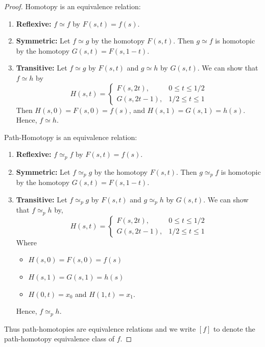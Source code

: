 \documentclass[12pt]{amsart}
\begin{document}
\begin{proof}
    \bbni

    Homotopy is an equivalence relation: 
    \begin{enumerate}
        \item \textbf{Reflexive:} $f \simeq f$ by $F(s,t) = f(s)$. 
        \item \textbf{Symmetric:} Let $f \simeq g$ by the homotopy $F(s,t)$. Then $g \simeq f$ is homotopic by the homotopy $G(s,t) = F(s,1-t)$. 
        \item \textbf{Transitive:} Let $f \simeq g$ by $F(s,t)$ and $g \simeq h$ by $G(s,t)$. We can show that $f \simeq h$ by \[H(s,t) = \begin{cases}
            F(s, 2t), & 0 \leq t \leq 1/2 \\ 
            G(s, 2t-1), & 1/2 \leq t \leq 1 
        \end{cases}\]
        Then $H(s, 0) = F(s, 0) = f(s)$, and $H(s, 1) = G(s, 1) = h(s)$. Hence, $f \simeq h$. 
    \end{enumerate}

    Path-Homotopy is an equivalence relation: 
    \begin{enumerate}
        \item \textbf{Reflexive:} $f \simeq_p f$ by $F(s,t) = f(s)$. 
        \item \textbf{Symmetric:} Let $f \simeq_p g$ by the homotopy $F(s,t)$. Then $g \simeq_p f$ is homotopic by the homotopy $G(s,t) = F(s,1-t)$. 
        \item \textbf{Transitive:} Let $f \simeq_p g$ by $F(s,t)$ and $g \simeq_p h$ by $G(s,t)$. We can show that $f \simeq_p h$ by, 
        \[H(s,t) = \begin{cases}
            F(s, 2t), & 0 \leq t \leq 1/2 \\ 
            G(s, 2t-1), & 1/2 \leq t \leq 1 
        \end{cases}\]
        Where 
        \begin{itemize}
            \item $H(s, 0) = F(s, 0) = f(s)$
            \item $H(s, 1) = G(s, 1) = h(s)$ 
            \item $H(0, t) = x_0$ and $H(1, t) = x_1$. 
        \end{itemize}
        Hence, $f \simeq_p h$. 
    \end{enumerate}
    Thus path-homotopies are equivalence relations and we write $[f]$ to denote the path-homotopy equivalence class of $f$. 
\end{proof}
\end{document}
